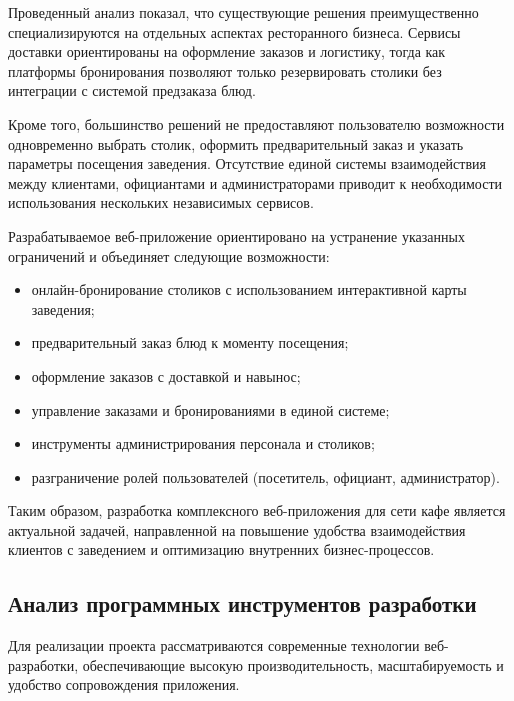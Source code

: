 Проведенный анализ показал, что существующие решения преимущественно специализируются на отдельных аспектах ресторанного бизнеса. Сервисы доставки ориентированы на оформление заказов и логистику, тогда как платформы бронирования позволяют только резервировать столики без интеграции с системой предзаказа блюд.

Кроме того, большинство решений не предоставляют пользователю возможности одновременно выбрать столик, оформить предварительный заказ и указать параметры посещения заведения. Отсутствие единой системы взаимодействия между клиентами, официантами и администраторами приводит к необходимости использования нескольких независимых сервисов.

Разрабатываемое веб-приложение ориентировано на устранение указанных ограничений и объединяет следующие возможности:

\begin{itemize}
\item онлайн-бронирование столиков с использованием интерактивной карты заведения;

\item предварительный заказ блюд к моменту посещения;

\item оформление заказов с доставкой и навынос;

\item управление заказами и бронированиями в единой системе;

\item инструменты администрирования персонала и столиков;

\item разграничение ролей пользователей (посетитель, официант, администратор).

\end{itemize}

Таким образом, разработка комплексного веб-приложения для сети кафе является актуальной задачей, направленной на повышение удобства взаимодействия клиентов с заведением и оптимизацию внутренних бизнес-процессов.

\subsection{Анализ программных инструментов разработки}

Для реализации проекта рассматриваются современные технологии веб-разработки, обеспечивающие высокую производительность, масштабируемость и удобство сопровождения приложения.

